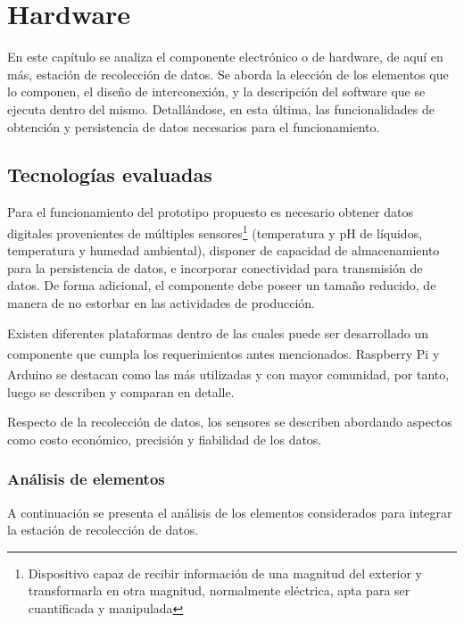 \chapter{Hardware}
\label{CapituloHardware}
\par En este capítulo se analiza el componente electrónico o de hardware, de aquí en más, estación de recolección de datos. Se aborda la elección de los elementos que lo componen, el diseño de interconexión, y la descripción del software que se ejecuta dentro del mismo. Detallándose, en esta última, las funcionalidades de obtención y persistencia de datos necesarios para el funcionamiento.

\section{Tecnologías evaluadas}
\label{SeccionTecnoEvalHardware}
    \par Para el funcionamiento del prototipo propuesto es necesario obtener datos digitales provenientes de múltiples sensores\footnote{Dispositivo capaz de recibir información de una magnitud del exterior y transformarla en otra magnitud, normalmente eléctrica, apta para ser cuantificada y manipulada} (temperatura y pH de líquidos,  temperatura y humedad ambiental), disponer de capacidad de almacenamiento para la persistencia de datos, e incorporar conectividad para transmisión de datos. De forma adicional, el componente debe poseer un tamaño reducido, de manera de no estorbar en las actividades de producción.

    \par Existen diferentes plataformas dentro de las cuales puede ser desarrollado un componente que cumpla los requerimientos antes mencionados. Raspberry Pi\textsuperscript{\textregistered} y Arduino\textsuperscript{\textregistered} se destacan como las más utilizadas y con mayor comunidad, por tanto, luego se describen y comparan en detalle.
    
    \par Respecto de la recolección de datos, los sensores se describen abordando aspectos como costo económico, precisión y fiabilidad de los datos.
    
    \subsection{Análisis de elementos}
    \par A continuación se presenta el análisis de los elementos considerados para integrar la estación de recolección de datos.
    
